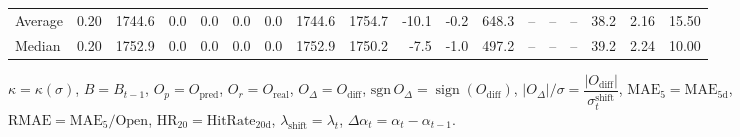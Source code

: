 \begin{threeparttable}
{\begin{tabular}{lrrrrrrrrrrrrrrrrr}
Average &     0.20 & 1744.6 &               0.0 &               0.0 &                0.0 &                0.0 & 1744.6 & 1754.7 &      -10.1 &                     -0.2 &               648.3 &         -- &        -- &             -- &             38.2 &            2.16 &                  15.50 \\
 Median &     0.20 & 1752.9 &               0.0 &               0.0 &                0.0 &                0.0 & 1752.9 & 1750.2 &       -7.5 &                     -1.0 &               497.2 &         -- &        -- &             -- &             39.2 &            2.24 &                  10.00 \\
\bottomrule
\end{tabular}
}
\begin{tablenotes}\footnotesize
\item $\kappa=\kappa(\sigma)$, $B=B_{t-1}$, $O_p=O_{\text{pred}}$, $O_r=O_{\text{real}}$, $O_\Delta=O_{\text{diff}}$, $\mathrm{sgn}\,O_\Delta=\operatorname{sign}(O_{\text{diff}})$, $|O_\Delta|/\sigma=\dfrac{|O_{\text{diff}}|}{\sigma_t^{\text{shift}}}$, $\mathrm{MAE}_5=\mathrm{MAE}_{5\text{d}}$, $\mathrm{RMAE}= \mathrm{MAE}_5 / \text{Open}$, $\mathrm{HR}_{20}=\mathrm{HitRate}_{20\text{d}}$, 
$\lambda_{\text{shift}}=\lambda_t$, 
$\Delta\alpha_t=\alpha_t-\alpha_{t-1}$.
\end{tablenotes}
\end{threeparttable}
\endgroup

